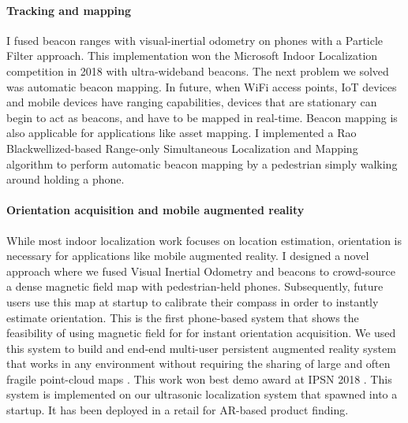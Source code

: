 \documentclass[10pt]{article}
\begin{document}


\paragraph{Tracking and mapping}
I fused beacon ranges with visual-inertial odometry on phones with a Particle Filter approach. This implementation won the Microsoft Indoor Localization competition in 2018 with ultra-wideband beacons. The next problem we solved was automatic beacon mapping. In future, when WiFi access points, IoT devices and mobile devices have ranging capabilities, devices that are stationary can begin to act as beacons, and have to be mapped in real-time. Beacon mapping is also applicable for applications like asset mapping. I implemented a Rao Blackwellized-based Range-only Simultaneous Localization and Mapping algorithm to perform automatic beacon mapping by a pedestrian simply walking around holding a phone. 

\paragraph{Orientation acquisition and mobile augmented reality }

While most indoor localization work focuses on location
estimation, orientation is necessary for applications like mobile
augmented reality. %
I designed a novel approach where we fused Visual
Inertial Odometry and beacons to crowd-source a dense magnetic field
map with pedestrian-held phones. Subsequently, future users use this map at startup to calibrate
their compass in order to instantly estimate orientation. %
This is the first phone-based system that shows the feasibility of using magnetic field for
for instant orientation acquisition. %
We used
this system to build and end-end multi-user persistent augmented
reality system that works in any environment without requiring the
sharing of large and often fragile point-cloud maps \cite{mobileAR}. This work won best demo award at IPSN 2018 \cite{rajagopal2018welcome}. This system is implemented on our ultrasonic localization system that spawned into a startup. It has been deployed in a retail for AR-based product finding. 
\end{document}
